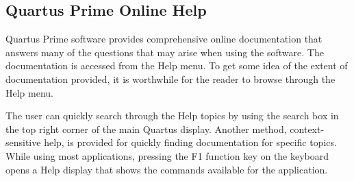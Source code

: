 \subsection{Quartus\textsuperscript{\textregistered} Prime Online Help}


Quartus Prime software provides comprehensive online documentation that answers
many of the questions that may arise when using the software. The documentation is accessed
from the {\sf Help} menu.
To get some idea of the extent of documentation provided,
it is worthwhile for the reader to browse through the {\sf Help}
menu.

The user can quickly search through the Help topics by using the 
search box in the top right corner of the main Quartus display.
Another method, context-sensitive help, is provided for quickly finding documentation for
specific topics. While using most applications, pressing the {\sf F1} function
key on the keyboard opens a Help display that
shows the commands available for the application. 
